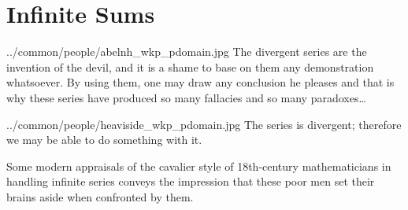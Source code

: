 ﻿





\chapter{Infinite Sums}


  {../common/people/abelnh_wkp_pdomain.jpg}
  {The divergent series are the invention of the devil, and it is a shame to base on them any demonstration whatsoever.
   By using them, one may draw any conclusion he pleases and that is why these series have produced so many 
   fallacies and so many paradoxes\ldots}

{../common/people/heaviside_wkp_pdomain.jpg}
{The series is divergent; therefore we may be able to do something with it.}

{Some modern appraisals of the cavalier style of 18th-century mathematicians in handling 
infinite series conveys the impression that these poor men set their brains aside when 
confronted by them.}

